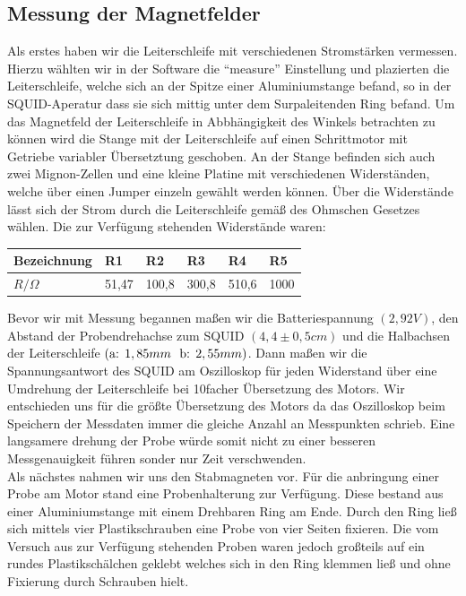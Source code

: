 \documentclass[12pt]{article}
\begin{document}
\subsection{Messung der Magnetfelder}
Als erstes haben wir die Leiterschleife mit verschiedenen Stromstärken vermessen.
Hierzu wählten wir in der Software die "`measure"' Einstellung und plazierten die Leiterschleife, welche sich an der Spitze einer Aluminiumstange befand, so in der SQUID-Aperatur dass sie sich mittig unter dem Surpaleitenden Ring befand. Um das Magnetfeld der Leiterschleife in Abbhängigkeit des Winkels betrachten zu können wird die Stange mit der Leiterschleife auf einen Schrittmotor mit Getriebe variabler Übersetztung geschoben. An der Stange befinden sich auch zwei Mignon-Zellen und eine kleine Platine mit verschiedenen Widerständen, welche über einen Jumper einzeln gewählt werden können. Über die Widerstände lässt sich der Strom durch die Leiterschleife gemäß des Ohmschen Gesetzes wählen. Die zur Verfügung stehenden Widerstände waren:
\begin{center}
\begin{tabular}{|l|lllll|}
\hline 
Bezeichnung & R1 & R2 & R3 & R4 & R5\\
\hline 
$R / \Omega$ & 51,47 & 100,8 & 300,8 & 510,6 & 1000\\
\hline 
\end{tabular}
\end{center}
Bevor wir mit Messung begannen maßen wir die Batteriespannung $(2,92V)$, den Abstand der Probendrehachse zum SQUID $(4,4 \pm 0,5 cm)$ und die Halbachsen der Leiterschleife $(\textnormal{a: }1,85mm~\textnormal{ b: }2,55mm)$. Dann maßen wir die Spannungsantwort des SQUID am Oszilloskop für jeden Widerstand über eine Umdrehung der Leiterschleife bei 10facher Übersetzung des Motors. Wir entschieden uns für die größte Übersetzung des Motors da das Oszilloskop beim Speichern der Messdaten immer die gleiche Anzahl an Messpunkten schrieb. Eine langsamere drehung der Probe würde somit nicht zu einer besseren Messgenauigkeit führen sonder nur Zeit verschwenden.\\

Als nächstes nahmen wir uns den Stabmagneten vor. Für die anbringung einer Probe am Motor stand eine Probenhalterung zur Verfügung. Diese bestand aus einer Aluminiumstange mit einem Drehbaren Ring am Ende. Durch den Ring ließ sich mittels vier Plastikschrauben eine Probe von vier Seiten fixieren. Die vom Versuch aus zur Verfügung stehenden Proben waren jedoch großteils auf ein rundes Plastikschälchen geklebt welches sich in den Ring klemmen ließ und ohne Fixierung durch Schrauben hielt.
\end{document}
